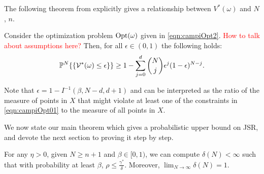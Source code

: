 The following theorem from \cite{campi} explicitly gives a relationship between $V^*(\omega)$ and $N$, $n$.
\begin{theorem}\label{thm:campi}Consider the optimization problem $\text{Opt}(\omega)$ given in \eqref{eqn:campiOpt2}. \textcolor{red}{How to talk about assumptions here?} Then, for all $\epsilon \in (0,1)$ the following holds:
\begin{equation*}\mathbb{P}^N\{\{\mathcal{V}^*(\omega) \leq \epsilon\} \} \geq 1- \sum_{j=0}^{d} \binom{N}{j}\epsilon^j (1-\epsilon)^{N-j}.\end{equation*}
\end{theorem}

Note that $\epsilon=1-I^{-1}(\beta, N-d, d+1)$ and can be interpreted as the ratio of the measure of points in $X$ that might violate at least one of the constraints in \eqref{eqn:campiOpt01} to the measure of all points in $X$.

We now state our main theorem which gives a probabilistic upper bound on JSR, and devote the next section to proving it step by step.

\begin{theorem} \label{thm:mainTheorem} For any $\eta > 0$, given $N \geq n+1$ and $\beta \in [0,1)$, we can compute $\delta(N) < \infty$ such that with probability at least $\beta$, $\rho \leq \frac{\gamma^*}{\delta}$. Moreover, $\lim_{N \to \infty} \delta(N) = 1$.
\end{theorem}